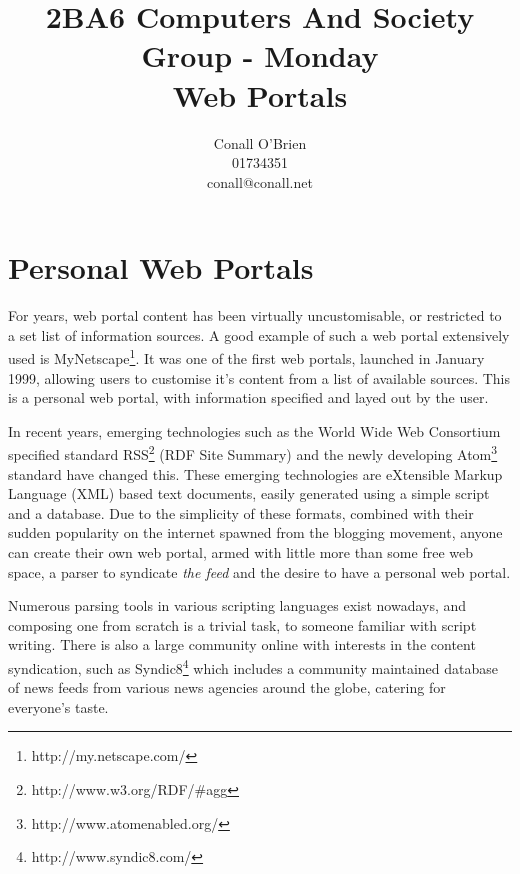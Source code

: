 \documentclass[a4paper,10pt]{article}
\begin{document}
\title{2BA6 Computers And Society \\ Group - Monday \\ Web Portals}

\author{Conall O'Brien \\ 01734351 \\ conall@conall.net}

\maketitle

\section*{Personal Web Portals}

For years, web portal content has been virtually uncustomisable, or
restricted to a set list of information sources. A good example of such
a web portal extensively used is 
MyNetscape\footnote{http://my.netscape.com/}. It was one of the first 
web portals, launched in January 1999, allowing users to customise 
it's content from a list of available sources. This is a personal 
web portal, with information specified and layed out by the user.


In recent years, emerging technologies such as the 
World Wide Web Consortium specified standard
RSS\footnote{http://www.w3.org/RDF/\#agg} (RDF Site Summary) and the
newly developing Atom\footnote{http://www.atomenabled.org/} standard
have changed this. These emerging technologies are
eXtensible Markup Language (XML) based text documents, easily
generated using a simple script and a database. Due to the simplicity of
these formats, combined with their sudden popularity on the internet
spawned from the blogging movement, anyone can create their own web
portal, armed with little more than some free web space, a parser to
syndicate \textit{the feed} and the desire to have a personal web
portal.


Numerous parsing tools in various scripting languages exist nowadays,
and composing one from scratch is a trivial task, to someone
familiar with script writing. There is also a large community online
with interests in the content syndication, such as
Syndic8\footnote{http://www.syndic8.com/} which includes a community
maintained database of news feeds from various news agencies around the
globe, catering for everyone's taste.
\end{document}
